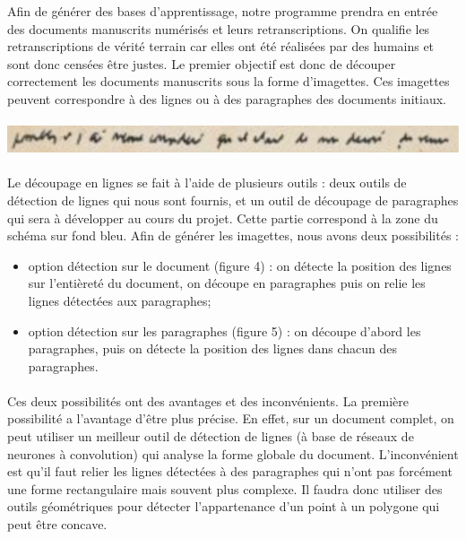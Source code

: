 Afin de générer des bases d’apprentissage, notre programme prendra en entrée des documents manuscrits
numérisés et leurs retranscriptions. On qualifie les retranscriptions de vérité terrain car elles
ont été réalisées par des humains et sont donc censées être justes. Le premier objectif est donc de
découper correctement les documents manuscrits sous la forme d’imagettes. Ces imagettes peuvent
correspondre à des lignes ou à des paragraphes des documents initiaux.

\paragraph{}
\begin{mdframed}[frametitle={Figure 3 : Exemple d'imagette}, innerbottommargin=10]
\begin{center}
\includegraphics[width=\linewidth]{imagette.png}
\end{center}
\end{mdframed}

\paragraph{}
Le découpage en lignes se fait à l’aide de plusieurs outils : deux outils de détection de lignes qui nous sont fournis,
et un outil de découpage de paragraphes qui sera à développer au cours du projet. Cette partie correspond à la zone du
schéma sur fond bleu. Afin de générer les imagettes, nous avons deux possibilités :

\begin{itemize}
\item option détection sur le document (figure 4) : on détecte la position des lignes sur l’entièreté du document,
on découpe en paragraphes puis on relie les lignes détectées aux paragraphes;

\item option détection sur les paragraphes (figure 5) : on découpe d’abord les paragraphes, puis on détecte la position
des lignes dans chacun des paragraphes.
\end{itemize}

\paragraph{}
Ces deux possibilités ont des avantages et des inconvénients. La première possibilité a l’avantage d’être plus précise.
En effet, sur un document complet, on peut utiliser un meilleur outil de détection de lignes (à base de réseaux de
neurones à convolution) qui analyse la forme globale du document. L’inconvénient est qu’il faut relier les lignes
détectées à des paragraphes qui n’ont pas forcément une forme rectangulaire mais souvent plus complexe. Il faudra
donc utiliser des outils géométriques pour détecter l’appartenance d’un point à un polygone qui peut être concave.

